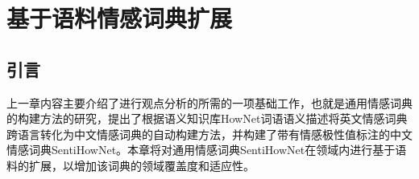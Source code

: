 \chapter{基于语料情感词典扩展}
\label{ch3}

\section{引言}
上一章内容主要介绍了进行观点分析的所需的一项基础工作，也就是通用情感词典的构建方法的研究，提出了根据语义知识库HowNet词语语义描述将英文情感词典跨语言转化为中文情感词典的自动构建方法，并构建了带有情感极性值标注的中文情感词典SentiHowNet。本章将对通用情感词典SentiHowNet在领域内进行基于语料的扩展，以增加该词典的领域覆盖度和适应性。


